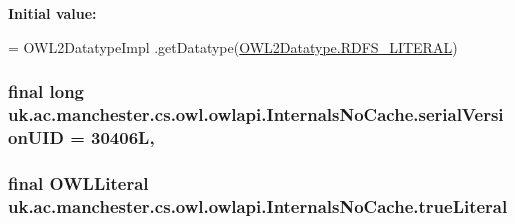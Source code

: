 {\bfseries Initial value\-:}
\begin{DoxyCode}
= OWL2DatatypeImpl
            .getDatatype(\hyperlink{enumorg_1_1semanticweb_1_1owlapi_1_1vocab_1_1_o_w_l2_datatype_a4c24cef892d78edf3441707250688e38}{OWL2Datatype.RDFS\_LITERAL})
\end{DoxyCode}
\hypertarget{classuk_1_1ac_1_1manchester_1_1cs_1_1owl_1_1owlapi_1_1_internals_no_cache_af57e31b0866b49416b438da42fb2ed1c}{
\subsubsection[{serial\-Version\-U\-I\-D}]{\setlength{\rightskip}{0pt plus 5cm}final long uk.\-ac.\-manchester.\-cs.\-owl.\-owlapi.\-Internals\-No\-Cache.\-serial\-Version\-U\-I\-D = 30406\-L\hspace{0.3cm}{\ttfamily [static]}, {\ttfamily [private]}}}\label{classuk_1_1ac_1_1manchester_1_1cs_1_1owl_1_1owlapi_1_1_internals_no_cache_af57e31b0866b49416b438da42fb2ed1c}
\hypertarget{classuk_1_1ac_1_1manchester_1_1cs_1_1owl_1_1owlapi_1_1_internals_no_cache_a4b6cd6f2f3361713ea5f10937b55e363}{
\subsubsection[{true\-Literal}]{\setlength{\rightskip}{0pt plus 5cm}final {\bf O\-W\-L\-Literal} uk.\-ac.\-manchester.\-cs.\-owl.\-owlapi.\-Internals\-No\-Cache.\-true\-Literal\hspace{0.3cm}{\ttfamily [private]}}}\label{classuk_1_1ac_1_1manchester_1_1cs_1_1owl_1_1owlapi_1_1_internals_no_cache_a4b6cd6f2f3361713ea5f10937b55e363}
